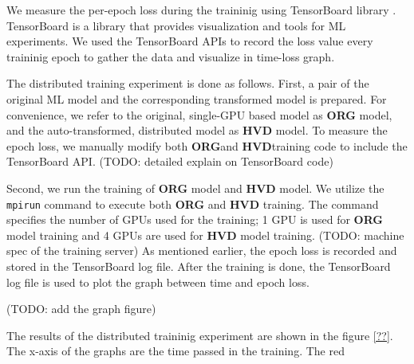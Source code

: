 We measure the per-epoch loss during the traininig using
TensorBoard library \cite{tensorboard}. 
TensorBoard is a library that provides visualization and tools
for ML experiments.
We used the TensorBoard APIs to record the loss value every traininig epoch
to gather the data and visualize in time-loss graph.

\newcommand{\orgbf}{\textbf{ORG}}
\newcommand{\hvdbf}{\textbf{HVD}}

The distributed training experiment is done as follows.
First, a pair of the original ML model and the corresponding transformed model
is prepared. For convenience, we refer to the original, single-GPU based model
as \textbf{ORG} model, and the auto-transformed, distributed model as
\textbf{HVD} model. To measure the epoch loss, we manually modify both  
\orgbf and \hvdbf training code to include the TensorBoard API. 
(TODO: detailed explain on TensorBoard code)

Second, we run the training of \textbf{ORG} model and
\textbf{HVD} model. We utilize the {\tt mpirun} command to execute both
\textbf{ORG} and \textbf{HVD} training. The command specifies the number of
GPUs used for the training; 1 GPU is used for \textbf{ORG} model training  
and 4 GPUs are used for \textbf{HVD} model training. 
(TODO: machine spec of the training server)
As mentioned earlier, the epoch loss is recorded and stored in the
TensorBoard log file.
After the training is done, the TensorBoard log file is used to plot the
graph between time and epoch loss. 

(TODO: add the graph figure)

The results of the distributed traininig experiment 
are shown in the figure \ref{??}.
The x-axis of the graphs are the time passed in the training.
The red 

